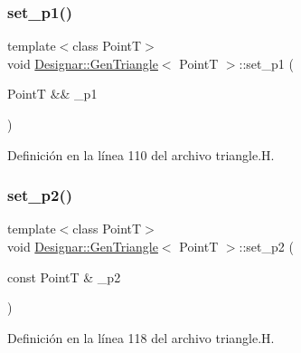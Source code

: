 \mbox{\label{class_designar_1_1_gen_triangle_af6834f2d91ca020c2cebedc990e9db5d}} 
\subsubsection{\texorpdfstring{set\+\_\+p1()}{set\_p1()}\hspace{0.1cm}{\footnotesize\ttfamily [2/2]}}
{\footnotesize\ttfamily template$<$class PointT$>$ \\
void \hyperlink{class_designar_1_1_gen_triangle}{Designar\+::\+Gen\+Triangle}$<$ PointT $>$\+::set\+\_\+p1 (\begin{DoxyParamCaption}\item[{PointT \&\&}]{\+\_\+p1 }\end{DoxyParamCaption})\hspace{0.3cm}{\ttfamily [inline]}}



Definición en la línea 110 del archivo triangle.\+H.

\mbox{\label{class_designar_1_1_gen_triangle_a866c788d9a7f7cb8c4bde20ceb149408}} 
\subsubsection{\texorpdfstring{set\+\_\+p2()}{set\_p2()}\hspace{0.1cm}{\footnotesize\ttfamily [1/2]}}
{\footnotesize\ttfamily template$<$class PointT$>$ \\
void \hyperlink{class_designar_1_1_gen_triangle}{Designar\+::\+Gen\+Triangle}$<$ PointT $>$\+::set\+\_\+p2 (\begin{DoxyParamCaption}\item[{const PointT \&}]{\+\_\+p2 }\end{DoxyParamCaption})\hspace{0.3cm}{\ttfamily [inline]}}



Definición en la línea 118 del archivo triangle.\+H.

